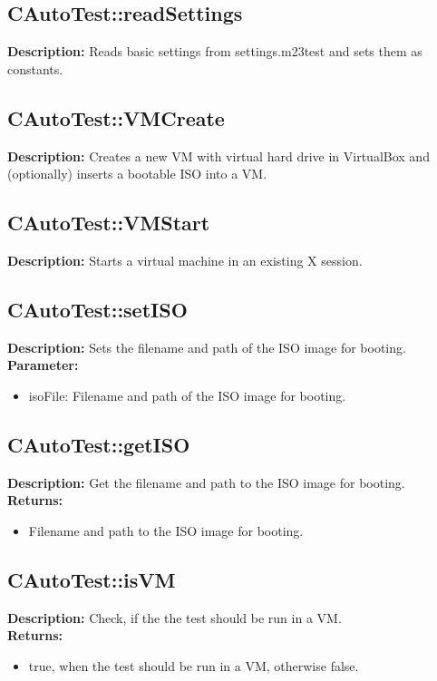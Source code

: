 \subsection{CAutoTest::readSettings}
\textbf{Description:} Reads basic settings from settings.m23test and sets them as constants.\\

\subsection{CAutoTest::VMCreate}
\textbf{Description:} Creates a new VM with virtual hard drive in VirtualBox and (optionally) inserts a bootable ISO into a VM.\\

\subsection{CAutoTest::VMStart}
\textbf{Description:} Starts a virtual machine in an existing X session.\\

\subsection{CAutoTest::setISO}
\textbf{Description:} Sets the filename and path of the ISO image for booting.\\
\textbf{Parameter:}
\begin{itemize}
\item isoFile: Filename and path of the ISO image for booting.
\end{itemize}

\subsection{CAutoTest::getISO}
\textbf{Description:} Get the filename and path to the ISO image for booting.\\
\textbf{Returns:}
\begin{itemize}
\item Filename and path to the ISO image for booting.
\end{itemize}

\subsection{CAutoTest::isVM}
\textbf{Description:} Check, if the the test should be run in a VM.\\
\textbf{Returns:}
\begin{itemize}
\item true, when the test should be run in a VM, otherwise false.
\end{itemize}

